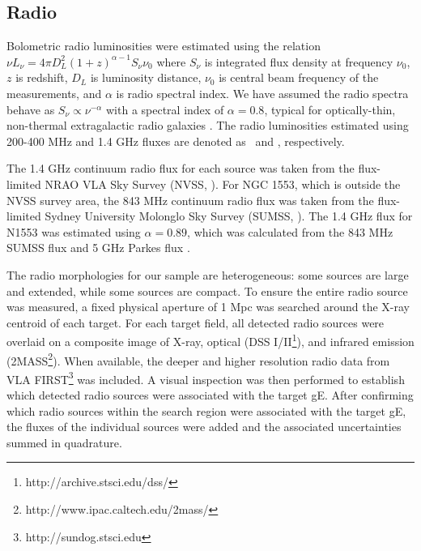\documentclass{emulateapj}
\begin{document}
\subsection{Radio}
\label{sec:radio}

Bolometric radio luminosities were estimated using the relation $\nu
L_{\nu} = 4 \pi D_L^2 (1+z)^{\alpha-1} S_{\nu} \nu_0$ where $S_{\nu}$
is integrated flux density at frequency $\nu_0$, $z$ is redshift,
$D_L$ is luminosity distance, $\nu_0$ is central beam frequency of the
measurements, and $\alpha$ is radio spectral index. We have assumed
the radio spectra behave as $S_{\nu} \propto \nu^{-\alpha}$ with a
spectral index of $\alpha = 0.8$, typical for optically-thin,
non-thermal extragalactic radio galaxies
\citep{1992ARA&A..30..575C}. The radio luminosities estimated using
200-400 MHz and 1.4 GHz fluxes are denoted as \plow\ and \phigh,
respectively.

The 1.4 GHz continuum radio flux for each source was taken from the
flux-limited NRAO VLA Sky Survey (NVSS, \citealt{nvss}). For NGC 1553,
which is outside the NVSS survey area, the 843 MHz continuum radio
flux was taken from the flux-limited Sydney University Molonglo Sky
Survey (SUMSS, \citealt{sumss1, sumss2}). The 1.4 GHz flux for N1553
was estimated using $\alpha = 0.89$, which was calculated from the 843
MHz SUMSS flux and 5 GHz Parkes flux \citep{1970ApL.....5...29W}.

The radio morphologies for our sample are heterogeneous: some sources
are large and extended, while some sources are compact. To ensure the
entire radio source was measured, a fixed physical aperture of 1 Mpc
was searched around the X-ray centroid of each target. For each target
field, all detected radio sources were overlaid on a composite image
of X-ray, optical (DSS I/II\footnote{http://archive.stsci.edu/dss/}),
and infrared emission
(2MASS\footnote{http://www.ipac.caltech.edu/2mass/}). When available,
the deeper and higher resolution radio data from VLA
FIRST\footnote{http://sundog.stsci.edu} was included. A visual
inspection was then performed to establish which detected radio
sources were associated with the target gE. After confirming which
radio sources within the search region were associated with the target
gE, the fluxes of the individual sources were added and the associated
uncertainties summed in quadrature.
\end{document}
